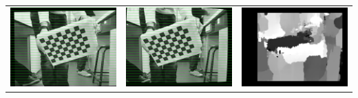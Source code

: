 \begin{frame}
\begin{tabular}{ccc}
        \includegraphics[width=0.3\linewidth]{rcs/rem2l.png} & \includegraphics[width=0.3\linewidth]{rcs/rem2r.png} & \includegraphics[width=0.3\linewidth]{rcs/disp2.png} \\
    \end{tabular}
\end{frame}

